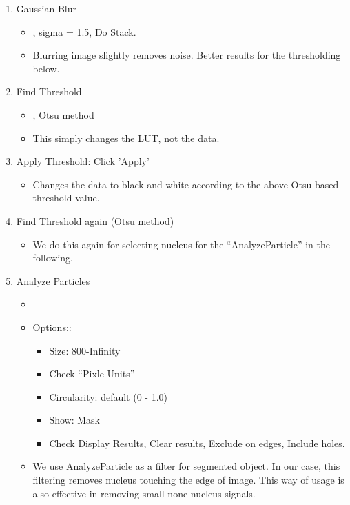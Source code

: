 \begin{enumerate}
  \item Gaussian Blur
  \begin{itemize}
    \item {}, sigma = 1.5, Do Stack.
    \item Blurring image slightly removes noise. Better results for the thresholding below.  
  \end{itemize}
  \item Find Threshold
  \begin{itemize}
    \item {},  Otsu method
    \item This simply changes the LUT, not the data. 
  \end{itemize}
  \item Apply Threshold: Click 'Apply'
  \begin{itemize}
    \item Changes the data to black and white according to the above Otsu based threshold value. 
  \end{itemize}
  \item Find Threshold again (Otsu method)
  \begin{itemize}
    \item We do this again for selecting nucleus for the ``AnalyzeParticle'' in the following.
  \end{itemize}
  \item Analyze Particles
  \begin{itemize}
    \item {}
    \item Options::
    \begin{itemize}
      \item Size: 800-Infinity
      \item Check ``Pixle Units''
      \item Circularity: default (0 - 1.0)
      \item Show: Mask
      \item Check Display Results, Clear results, Exclude on edges, Include holes. 
    \end{itemize}
    \item We use AnalyzeParticle as a filter for segmented object. In our case, this filtering removes nucleus touching the edge of image. This way of usage is also effective in removing small none-nucleus signals. 
  \end{itemize}

\end{enumerate}
